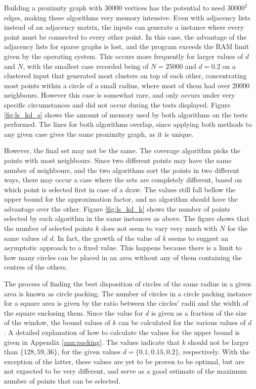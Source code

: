 Building a proximity graph with 30000 vertices has the potential to need $30000^2$ edges, making these algorithms very memory intensive. Even with adjacency lists instead of an adjacency matrix, the inputs can generate a instance where every point must be connected to every other point. In this case, the advantage of the adjacency lists for sparse graphs is lost, and the program exceeds the RAM limit given by the operating system. This occurs more frequently for larger values of $d$ and $N$, with the smallest case recorded being of $N=25000$ and $d=0.2$ on a clustered input that generated most clusters on top of each other, concentrating most points within a circle of a small radius, where most of them had over 20000 neighbours. However this case is somewhat rare, and only occurs under very specific circumstances and did not occur during the tests displayed. Figure \ref{fig:ls_kd_s} shows the amount of memory used by both algorithms on the tests performed. 
The lines for both algorithms overlap, since applying both methods to any given case gives the same proximity graph, as it is unique. 

However, the final set may not be the same. The coverage algorithm picks the points with most neighbours. Since two different points may have the same number of neighbours, and the two algorithms sort the points in two different ways, there may occur a case where the sets are completely different, based on which point is selected first in case of a draw. The values still fall bellow the upper bound for the approximation factor, and no algorithm should have the advantage over the other. Figure \ref{fig:ls_kd_k} shows the number of points selected by each algorithm in the same instances as above. The figure shows that the number of selected points $k$ does not seem to vary very much with $N$ for the same values of $d$. In fact, the growth of the value of $k$ seems to suggest an asymptotic approach to a fixed value. This happens because there is a limit to how many circles can be placed in an area without any of them containing the centres of the others. 





The process of finding the best disposition of circles of the same radius in a given area is known as circle packing. The number of circles in a circle packing instance for a square area is given by the ratio between the circles' radii and the width of the square enclosing them. Since the value for $d$ is given as a fraction of the size of the window, the bound values of $k$ can be calculated for the various values of $d$. A detailed explanation of how to calculate the values for the upper bound is given in Appendix \ref{ann:packing}. The values indicate that $k$ should not be larger than $\{128,59,36\}$, for the given values $d=\{0.1,0.15,0.2\}$, respectively. With the exception of the latter, these values are yet to be proven to be optimal, but are not expected to be very different, and serve as a good estimate of the maximum number of points that can be selected.

